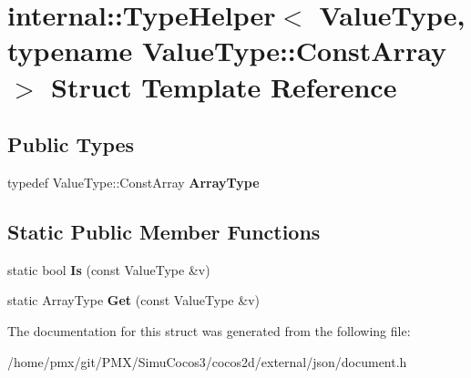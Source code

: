 \hypertarget{structinternal_1_1TypeHelper_3_01ValueType_00_01typename_01ValueType_1_1ConstArray_01_4}{}\section{internal\+:\+:Type\+Helper$<$ Value\+Type, typename Value\+Type\+:\+:Const\+Array $>$ Struct Template Reference}
\label{structinternal_1_1TypeHelper_3_01ValueType_00_01typename_01ValueType_1_1ConstArray_01_4}
\subsection*{Public Types}
\begin{DoxyCompactItemize}
\item 
\mbox{\label{structinternal_1_1TypeHelper_3_01ValueType_00_01typename_01ValueType_1_1ConstArray_01_4_a88c3a7bbff09fdd44ce6980f8122ba05}} 
typedef Value\+Type\+::\+Const\+Array {\bfseries Array\+Type}
\end{DoxyCompactItemize}
\subsection*{Static Public Member Functions}
\begin{DoxyCompactItemize}
\item 
\mbox{\label{structinternal_1_1TypeHelper_3_01ValueType_00_01typename_01ValueType_1_1ConstArray_01_4_a259497292f89c58789b1e947249dd299}} 
static bool {\bfseries Is} (const Value\+Type \&v)
\item 
\mbox{\label{structinternal_1_1TypeHelper_3_01ValueType_00_01typename_01ValueType_1_1ConstArray_01_4_a247811db25d6f25cc63175e03d847b8b}} 
static Array\+Type {\bfseries Get} (const Value\+Type \&v)
\end{DoxyCompactItemize}


The documentation for this struct was generated from the following file\+:\begin{DoxyCompactItemize}
\item 
/home/pmx/git/\+P\+M\+X/\+Simu\+Cocos3/cocos2d/external/json/document.\+h\end{DoxyCompactItemize}
